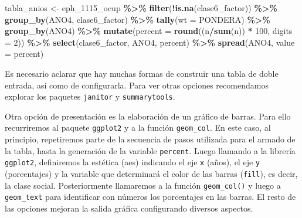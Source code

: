 \documentclass[
]{article}
\newenvironment{Shaded}{\begin{snugshade}}{\end{snugshade}}
\newcommand{\AttributeTok}[1]{\textcolor[rgb]{0.13,0.29,0.53}{#1}}
\newcommand{\DecValTok}[1]{\textcolor[rgb]{0.00,0.00,0.81}{#1}}
\newcommand{\FunctionTok}[1]{\textcolor[rgb]{0.13,0.29,0.53}{\textbf{#1}}}
\newcommand{\NormalTok}[1]{#1}
\newcommand{\OtherTok}[1]{\textcolor[rgb]{0.56,0.35,0.01}{#1}}
\newcommand{\SpecialCharTok}[1]{\textcolor[rgb]{0.81,0.36,0.00}{\textbf{#1}}}
\begin{document}
\begin{Shaded}
\begin{Highlighting}[]
\NormalTok{tabla\_anios }\OtherTok{\textless{}{-}}\NormalTok{ eph\_1115\_ocup }\SpecialCharTok{\%\textgreater{}\%}
    \FunctionTok{filter}\NormalTok{(}\SpecialCharTok{!}\FunctionTok{is.na}\NormalTok{(clase6\_factor)) }\SpecialCharTok{\%\textgreater{}\%}
    \FunctionTok{group\_by}\NormalTok{(ANO4, clase6\_factor) }\SpecialCharTok{\%\textgreater{}\%}
    \FunctionTok{tally}\NormalTok{(}\AttributeTok{wt =}\NormalTok{ PONDERA) }\SpecialCharTok{\%\textgreater{}\%}
    \FunctionTok{group\_by}\NormalTok{(ANO4) }\SpecialCharTok{\%\textgreater{}\%}
    \FunctionTok{mutate}\NormalTok{(}\AttributeTok{percent =} \FunctionTok{round}\NormalTok{((n}\SpecialCharTok{/}\FunctionTok{sum}\NormalTok{(n)) }\SpecialCharTok{*} \DecValTok{100}\NormalTok{, }\AttributeTok{digits =} \DecValTok{2}\NormalTok{)) }\SpecialCharTok{\%\textgreater{}\%}
    \FunctionTok{select}\NormalTok{(clase6\_factor, ANO4, percent) }\SpecialCharTok{\%\textgreater{}\%}
    \FunctionTok{spread}\NormalTok{(ANO4, }\AttributeTok{value =}\NormalTok{ percent)}
\end{Highlighting}
\end{Shaded}

Es necesario aclarar que hay muchas formas de construir una tabla de doble entrada, así como de configurarla. Para ver otras opciones recomendamos explorar los paquetes \texttt{janitor} y \texttt{summarytools}.

Otra opción de presentación es la elaboración de un gráfico de barras. Para ello recurriremos al paquete \texttt{ggplot2} y a la función \texttt{geom\_col}. En este caso, al principio, repetiremos parte de la secuencia de pasos utilizada para el armado de la tabla, hasta la generación de la variable \texttt{percent}. Luego llamando a la librería \texttt{ggplot2}, definiremos la estética (aes) indicando el eje \texttt{x} (años), el eje \texttt{y} (porcentajes) y la variable que determinará el color de las barras (\texttt{fill}), es decir, la clase social. Posteriormente llamaremos a la función \texttt{geom\_col()} y luego a \texttt{geom\_text} para identificar con números los porcentajes en las barras. El resto de las opciones mejoran la salida gráfica configurando diversos aspectos.
\end{document}
